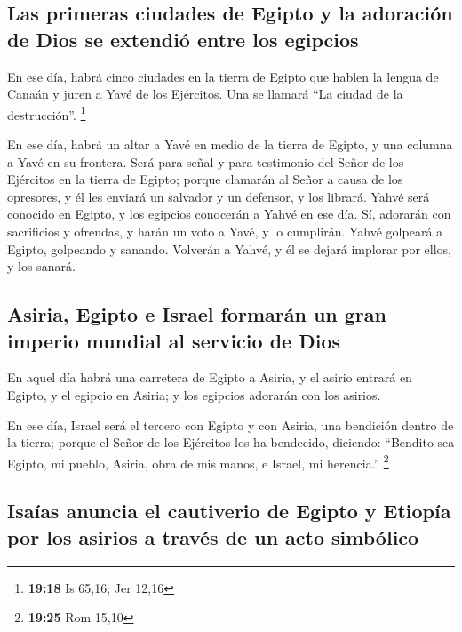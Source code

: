 \hypertarget{las-primeras-ciudades-de-egipto-y-la-adoraciuxf3n-de-dios-se-extendiuxf3-entre-los-egipcios}{%
\subsection{Las primeras ciudades de Egipto y la adoración de Dios se
extendió entre los
egipcios}\label{las-primeras-ciudades-de-egipto-y-la-adoraciuxf3n-de-dios-se-extendiuxf3-entre-los-egipcios}}

 En ese día, habrá cinco ciudades en la tierra de Egipto
que hablen la lengua de Canaán y juren a Yavé de los Ejércitos. Una se
llamará ``La ciudad de la destrucción''. \footnote{\textbf{19:18} Is
  65,16; Jer 12,16}

 En ese día, habrá un altar a Yavé en medio de la tierra
de Egipto, y una columna a Yavé en su frontera.  Será
para señal y para testimonio del Señor de los Ejércitos en la tierra de
Egipto; porque clamarán al Señor a causa de los opresores, y él les
enviará un salvador y un defensor, y los librará.  Yahvé
será conocido en Egipto, y los egipcios conocerán a Yahvé en ese día.
Sí, adorarán con sacrificios y ofrendas, y harán un voto a Yavé, y lo
cumplirán.  Yahvé golpeará a Egipto, golpeando y sanando.
Volverán a Yahvé, y él se dejará implorar por ellos, y los sanará.

\hypertarget{asiria-egipto-e-israel-formaruxe1n-un-gran-imperio-mundial-al-servicio-de-dios}{%
\subsection{Asiria, Egipto e Israel formarán un gran imperio mundial al
servicio de
Dios}\label{asiria-egipto-e-israel-formaruxe1n-un-gran-imperio-mundial-al-servicio-de-dios}}

 En aquel día habrá una carretera de Egipto a Asiria, y
el asirio entrará en Egipto, y el egipcio en Asiria; y los egipcios
adorarán con los asirios.

 En ese día, Israel será el tercero con Egipto y con
Asiria, una bendición dentro de la tierra;  porque el
Señor de los Ejércitos los ha bendecido, diciendo: ``Bendito sea Egipto,
mi pueblo, Asiria, obra de mis manos, e Israel, mi herencia.''
\footnote{\textbf{19:25} Rom 15,10}

\hypertarget{isauxedas-anuncia-el-cautiverio-de-egipto-y-etiopuxeda-por-los-asirios-a-travuxe9s-de-un-acto-simbuxf3lico}{%
\subsection{Isaías anuncia el cautiverio de Egipto y Etiopía por los
asirios a través de un acto
simbólico}\label{isauxedas-anuncia-el-cautiverio-de-egipto-y-etiopuxeda-por-los-asirios-a-travuxe9s-de-un-acto-simbuxf3lico}}

